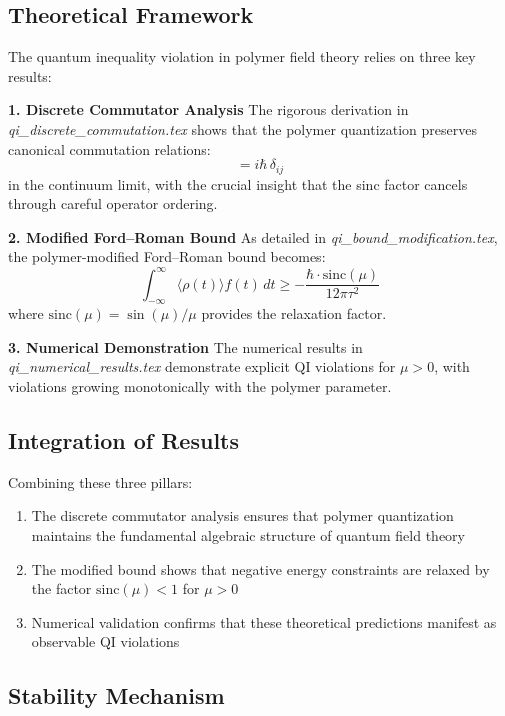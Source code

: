 \documentclass[12pt]{article}
\begin{document}
\subsection{Theoretical Framework}

The quantum inequality violation in polymer field theory relies on three key results:

\textbf{1. Discrete Commutator Analysis}
The rigorous derivation in \textit{qi\_discrete\_commutation.tex} shows that the polymer quantization preserves canonical commutation relations:
\begin{equation}
[\hat{\phi}_i, \hat{\pi}_j^{\text{poly}}] = i\hbar\,\delta_{ij}
\end{equation}
in the continuum limit, with the crucial insight that the sinc factor cancels through careful operator ordering.

\textbf{2. Modified Ford–Roman Bound}
As detailed in \textit{qi\_bound\_modification.tex}, the polymer-modified Ford–Roman bound becomes:
\begin{equation}
\int_{-\infty}^{\infty} \langle\rho(t)\rangle f(t) \, dt \geq -\frac{\hbar \cdot \text{sinc}(\mu)}{12\pi\tau^2}
\end{equation}
where $\text{sinc}(\mu) = \sin(\mu)/\mu$ provides the relaxation factor.

\textbf{3. Numerical Demonstration}
The numerical results in \textit{qi\_numerical\_results.tex} demonstrate explicit QI violations for $\mu > 0$, with violations growing monotonically with the polymer parameter.

\subsection{Integration of Results}

Combining these three pillars:
\begin{enumerate}
\item The discrete commutator analysis ensures that polymer quantization maintains the fundamental algebraic structure of quantum field theory
\item The modified bound shows that negative energy constraints are relaxed by the factor $\text{sinc}(\mu) < 1$ for $\mu > 0$
\item Numerical validation confirms that these theoretical predictions manifest as observable QI violations
\end{enumerate}

\subsection{Stability Mechanism}
\end{document}
